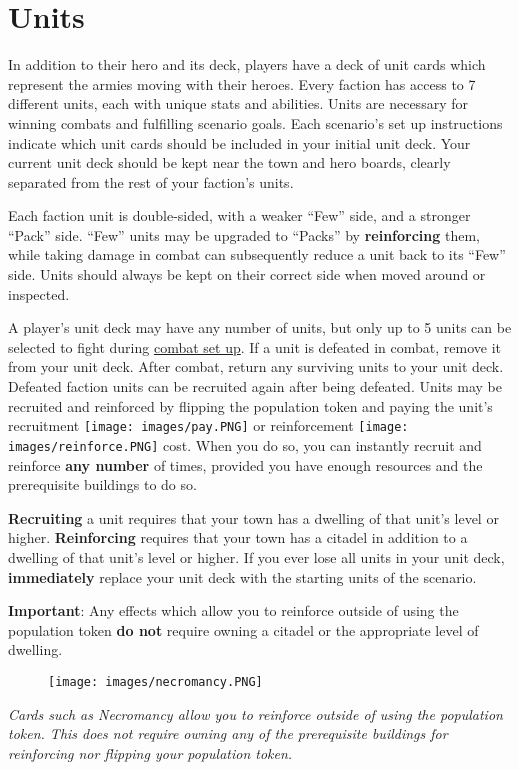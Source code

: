\documentclass[12pt]{article}
\begin{document}
\clearpage
\section[Units]{Units\hypertarget{Units}{}}

In addition to their hero and its deck, players have a deck of unit cards which represent the armies moving with their heroes. Every faction has access to 7 different units, each with unique stats and abilities. Units are necessary for winning combats and fulfilling scenario goals. Each scenario's set up instructions indicate which unit cards should be included in your initial unit deck. Your current unit deck should be kept near the town and hero boards, clearly separated from the rest of your faction’s units.\par
Each faction unit is double-sided, with a weaker “Few” side, and a stronger “Pack” side. “Few” units may be upgraded to “Packs” by \textbf{reinforcing} them, while taking damage in combat can subsequently reduce a unit back to its “Few” side. Units should always be kept on their correct side when moved around or inspected.\par
A player’s unit deck may have any number of units, but only up to 5 units can be selected to fight during \hyperlink{Combatsetup}{combat set up}. If a unit is defeated in combat, remove it from your unit deck. After combat, return any surviving units to your unit deck. Defeated faction units can be recruited again after being defeated. Units may be recruited and reinforced by flipping the population token and paying the unit's recruitment \texttt{[image: images/pay.PNG]} or reinforcement \texttt{[image: images/reinforce.PNG]} cost. When you do so, you can instantly recruit and reinforce \textbf{any number} of times, provided you have enough resources and the prerequisite buildings to do so.\par
\textbf{Recruiting} a unit requires that your town has a dwelling of that unit’s level or higher. \textbf{Reinforcing} requires that your town has a citadel in addition to a dwelling of that unit’s level or higher. If you ever lose all units in your unit deck, \textbf{immediately} replace your unit deck with the starting units of the scenario.\par
\textbf{Important}: Any effects which allow you to reinforce outside of using the population token \textbf{do not} require owning a citadel or the appropriate level of dwelling.
\begin{figure}[h]
\centering
\texttt{[image: images/necromancy.PNG]}
\end{figure}
\begin{center}
\textit{Cards such as Necromancy allow you to reinforce outside of using the population token. This does not require owning any of the prerequisite buildings for reinforcing nor flipping your population token.}
\end{center}
\end{document}
